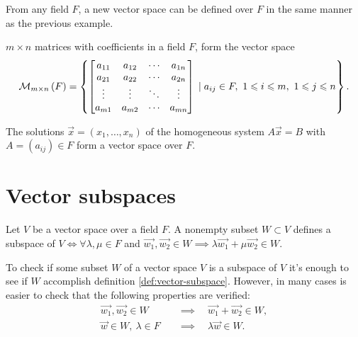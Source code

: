 From any field $F$, a new vector space can be defined over $F$ in the same manner as the previous example.

\begin{example}
    $m\times n$ matrices with coefficients in a field $F$, form the vector space
    \begin{equation}
        \mathcal{M}_{m\times n}\left( F \right) = \left\{
            \begin{bmatrix}
                a_{11} & a_{12} & \cdots & a_{1n} \\
                a_{21} & a_{22} & \cdots & a_{2n} \\
                \vdots & \vdots & \ddots & \vdots \\
                a_{m1} & a_{m2} & \cdots & a_{mn}
            \end{bmatrix} \; | \; a_{ij}\in F,\ 1 \leqslant i \leqslant m,\ 1\leqslant j\leqslant n
        \right\}.
    \end{equation}
\end{example}

\begin{example}
    The solutions $\vec{x} = \left( x_1, \ldots, x_n \right) $ of the homogeneous system $A\vec{x} = B$
    with $A = \left( a_{ij} \right) \in F$ form a vector space over $F$.
\end{example}

\section{Vector subspaces}
\begin{defi} \label{def:vector-subspace}
    Let $V$ be a vector space over a field $F$. A nonempty subset $W\subset V$ defines a subspace of $V
    \iff \forall \lambda, \mu\in F$ and $\vec{w_1}, \vec{w_2}\in W\implies \lambda\vec{w_1} +
        \mu\vec{w_2}\in W$.
\end{defi}

To check if some subset $W$ of a vector space $V$ is a subspace of $V$ it's enough to see if $W$ accomplish
definition \ref{def:vector-subspace}. However, in many cases is easier to check that the following properties
are verified:
\begin{align} \label{prop:vector-subspace-2}
    \vec{w_1}, \vec{w_2}\in W &\quad\implies\quad \vec{w_1} + \vec{w_2}\in W, \\
    \vec{w}\in W,\ \lambda\in F&\quad\implies\quad \lambda\vec{w}\in W.
\end{align}

